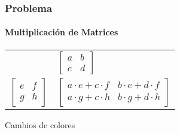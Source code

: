 \frame
{
\frametitle{Problema}
\framesubtitle{Multiplicación de Matrices}
\begin{center}
\begin{tabular}{ll}

	&
$
	\left[ \begin{array}{cc}
	a & b  \\
	c & d \end{array} \right]
$ 
	\vspace{0.5cm}\\

$
	\left[ \begin{array}{ccc}
	e & f \\
	g & h  \end{array} \right]
$ 

	&

$
	\left[ \begin{array}{ccc}
	a\cdot e + c\cdot f & b\cdot e + d\cdot f \\
	a\cdot g + c\cdot h & b\cdot g + d\cdot h \end{array} \right]
$ 

   
\end{tabular}
\end{center}

Cambios de colores

}
